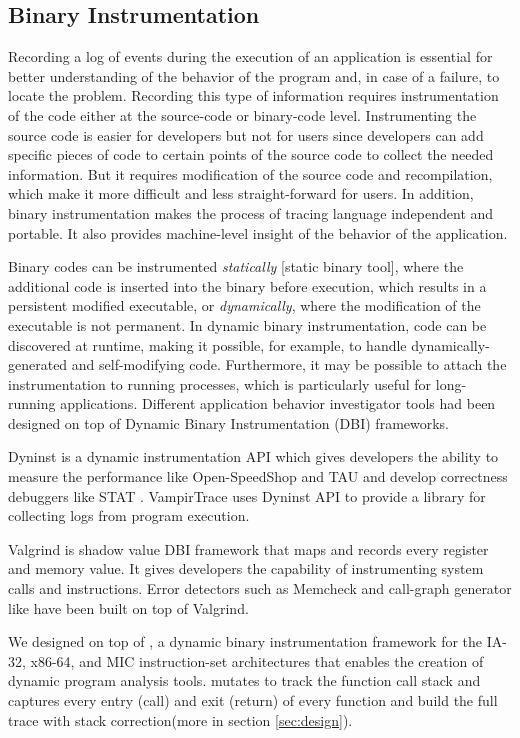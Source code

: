 
\subsection{Binary Instrumentation}
Recording a log of events during the execution of an application is essential for better understanding of the behavior of the program and, in case of a failure, to locate the problem. Recording this type of information requires instrumentation of the code either at the source-code or binary-code level. Instrumenting the source code is easier for developers but not for users since developers can add specific pieces of code to certain points of the source code to collect the needed information. But it requires modification of the source code and recompilation, which make it more difficult and less straight-forward for users. In addition, binary instrumentation makes the process of tracing language independent and portable. It also provides machine-level insight of the behavior of the application.


Binary codes can be instrumented \textit{statically} [static binary tool], where the additional code is inserted into the binary before execution, which results in a persistent modified executable, or \textit{dynamically}, where the modification of the executable is not permanent. In dynamic binary instrumentation, code can be discovered at runtime, making it possible, for example, to handle dynamically-generated and self-modifying code. Furthermore, it may be possible to attach the instrumentation to running processes, which is particularly useful for long-running applications.
Different application behavior investigator tools had been designed on top of Dynamic Binary Instrumentation (DBI) frameworks.


Dyninst\cite{dyninst} is a dynamic instrumentation API which gives developers the ability to measure the performance like Open-SpeedShop\cite{openss} and TAU\cite{tau} and develop correctness debuggers like STAT \cite{stat}. VampirTrace\cite{vampirt} uses Dyninst API to provide a library for collecting logs from program execution. 

Valgrind\cite{valgrind} is shadow value DBI framework that maps and records every register and memory value. It gives developers the capability of instrumenting system calls and instructions. Error detectors such as Memcheck\cite{memcheck} and call-graph generator like \callgrind\cite{callgrind} have been built on top of Valgrind.

We designed \parlot on top of \pin\cite{pin}, a dynamic binary instrumentation framework for the IA-32, x86-64, and MIC instruction-set architectures that enables the creation of dynamic program analysis tools. \parlot mutates \pin to track the function call stack and captures every entry (call) and exit (return) of every function and build the full trace with stack correction(more in section \ref{sec:design}).\\

